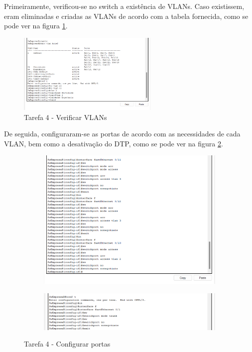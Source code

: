 \documentclass[11pt,english, openright, oneside]{book}
\begin{document}
Primeiramente, verificou-se no switch a existência de VLANs. Caso existissem,
eram eliminadas e criadas as VLANs de acordo com a tabela fornecida, como se
pode ver na figura \ref{fig:4.1.1}.

\begin{figure}[H]
    \centering
    \includegraphics[width=0.6\textwidth]{imagens/Tarefa4/4.1.1.png}
    \caption{Tarefa 4 - Verificar VLANs}
    \label{fig:4.1.1}
\end{figure}
\vspace{0.2cm}

De seguida, configuraram-se as portas de acordo com as necessidades de cada
VLAN, bem como a desativação do DTP, como se pode ver na figura \ref{fig:4.1.2}.

\begin{figure}[h]
    \centering
    \begin{subfigure}{.53\textwidth}
        \centering
        \includegraphics[width=0.99\linewidth]{imagens/Tarefa4/4.1.2.png}
    \end{subfigure}%
    \begin{subfigure}{.53\textwidth}
        \centering
        \includegraphics[width=0.99\linewidth]{imagens/Tarefa4/4.1.3.png}
    \end{subfigure}
    \caption{Tarefa 4 - Configurar portas}
    \label{fig:4.1.2}
\end{figure}
\vspace{0.2cm}
\end{document}
